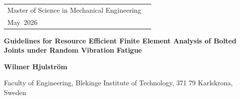 \documentclass[a4paper,twoside]{bth}
\newcommand{\thesisDegree}{Master of Science in Mechanical Engineering}
\newcommand{\thesisMonth}{May}
\newcommand{\thesisYear}{2026}
\newcommand{\faculty}{Engineering}
\newcommand{\thesisTitle}{Guidelines for Resource Efficient Finite Element Analysis of Bolted Joints under Random Vibration Fatigue}
\newcommand{\authorFirst}{Wilmer Hjulström}
\begin{document}
\pagestyle{plain}

{\pagestyle{empty}
\changepage{3cm}{1cm}{-0.5cm}{-0.5cm}{}{-1.5cm}{}{}{}
\noindent
\begin{tabular}{@{}p{} p{}}
\thesisDegree & \hfill\multirow{3}{*}{\bthcsnotextlogo{3cm}} \\
\thesisMonth $\,$ \thesisYear & \\
\end{tabular}

\center
\vspace {7.5cm}
{\Huge\textbf{\thesisTitle}}

\vspace {0.5cm}

\vspace{2cm}
{\Large\textbf{\authorFirst}}

\vspace{0.3cm}

\vspace*{\fill}

\noindent\makebox[\linewidth]{\rule{\textwidth}{1pt}} 
Faculty of \faculty, Blekinge Institute of Technology, 371 79 Karlskrona, Sweden

\clearpage
} %
\end{document}
